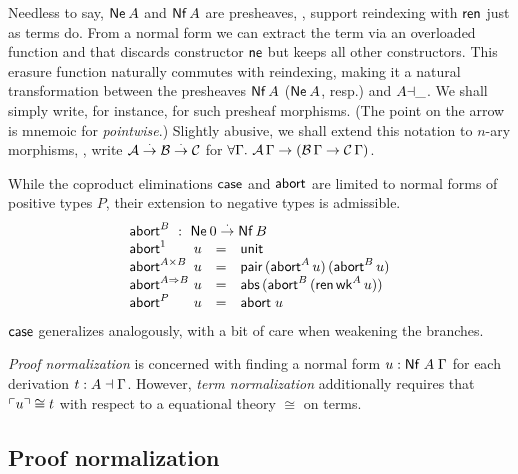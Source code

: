 \documentclass[a4paper,USenglish,cleveref, autoref]{lipics-v2019}
\begin{document}
Needless to say, $\mathsf{Ne}^{}\,A$ and
$\mathsf{Nf}\,A$ are presheaves, \ie, support reindexing with $\mathsf{ren}$ just as terms do.
From a normal form we can extract the term via an overloaded function
 and
that discards constructor $\mathsf{ne}$ but keeps all other constructors.
This erasure function naturally commutes with reindexing, making it a
natural transformation between the presheaves $\mathsf{Nf}\,A$ ($\mathsf{Ne}^{}\,A$,
resp.) and $A{\dashv}\_$.  We shall simply write, for instance,
 for such presheaf morphisms.
(The point on the arrow is mnemoic for \emph{pointwise}.)
Slightly abusive, we shall extend this notation to $n$-ary
morphisms, \eg, write $\mathcal{A} \stackrel{\cdot}{\to} \mathcal{B} \stackrel{\cdot}{\to} \mathcal{C}$ for
$\forall \Gamma.\ \mathcal{A}\,\Gamma \to (\mathcal{B}\,\Gamma \to \mathcal{C}\,\Gamma)$.

While the coproduct eliminations $\mathsf{case}$ and $\mathsf{abort}$ are limited to
normal forms of positive types $P$, their extension to negative types
is admissible.
\[
\begin{array}{l@{~}lcl}
  \multicolumn 4 l {\tabort^B ~:~ \tNe\, 0 \todot \tNf\,B} \\
  \tabort^{\tyone}     & u & = & \tunit \\
  \tabort^{A \times B} & u & = & \tpair\,(\tabort^A\,u)\,(\tabort^B\,u) \\
  \tabort^{A \To B}    & u & = & \tabs\,(\tabort^B\,(\tren\,\twk^A\,u)) \\
  \tabort^P           & u & = & \tabort\;u \\
\end{array}
\]
$\mathsf{case}$ generalizes analogously, with a bit of care when weakening
the branches.

\emph{Proof normalization} is concerned with finding a normal form
$u : \mathsf{Nf}\;A\;\Gamma$ for each derivation $t : A \dashv \Gamma$.  However,
\emph{term normalization} additionally requires that $\ulcorner u\urcorner \cong t$
with respect to a equational theory $\cong$ on terms.

\subsection{Proof normalization}
\end{document}
